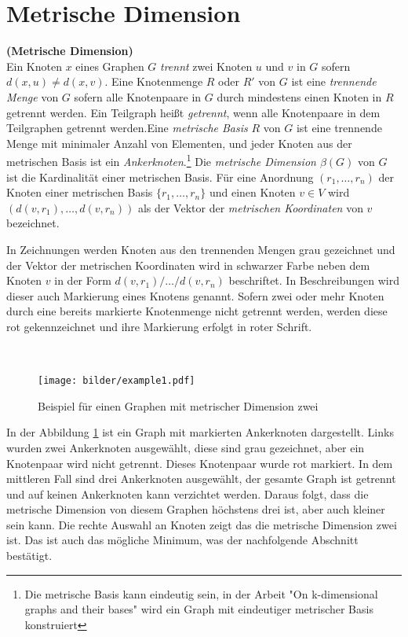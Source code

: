 \newpage
\section{Metrische Dimension}
\label{MDT}
\begin{defi}{\textbf{(Metrische Dimension)}}\\
Ein Knoten $x$ eines Graphen $G$ \emph{trennt} zwei Knoten $u$ und $v$ in $G$ sofern $d(x, u) \neq d(x, v)$. Eine Knotenmenge $R$ oder $R'$ von $G$ ist eine \emph{trennende Menge} von $G$ sofern alle Knotenpaare in $G$ durch mindestens einen Knoten in $R$ getrennt werden. Ein Teilgraph heißt \emph{getrennt}, wenn alle Knotenpaare in dem Teilgraphen getrennt werden.\newline \newline Eine \emph{metrische Basis} $R$ von $G$ ist eine trennende Menge mit minimaler Anzahl von Elementen, und jeder Knoten aus der metrischen Basis ist ein \emph{Ankerknoten}.\footnote{Die metrische Basis kann eindeutig sein, in der Arbeit "On k-dimensional graphs and their bases"\cite{bases} wird ein Graph mit eindeutiger metrischer Basis konstruiert} \newline\newline %
Die \emph{metrische Dimension $\beta(G)$} von $G$ ist die Kardinalität einer metrischen Basis. Für eine Anordnung $(r_1,\ldots,r_n)$ der Knoten einer metrischen Basis $\{r_1,\ldots,r_n\}$ und einen Knoten $v \in V$ wird $(d(v, r_1 ), \ldots , d(v, r_n ))$ als der Vektor der \emph{metrischen Koordinaten} von $v$ bezeichnet.
\end{defi}
\begin{bem}
In Zeichnungen werden Knoten aus den trennenden Mengen grau gezeichnet und der Vektor der metrischen Koordinaten wird in schwarzer Farbe neben dem Knoten $v$ in der Form $d(v, r_1 )/ \ldots / d(v, r_n )$ beschriftet. In Beschreibungen wird dieser auch Markierung eines Knotens genannt. Sofern zwei oder mehr Knoten durch eine bereits markierte Knotenmenge nicht getrennt werden, werden diese rot gekennzeichnet und ihre Markierung erfolgt in roter Schrift. 
\end{bem}
\begin{bsp}~
\begin{figure}[h!]
		\centering 		 
   \texttt{[image: bilder/example1.pdf]}
	\caption{Beispiel für einen Graphen mit metrischer Dimension zwei}
  	 \label{bild:bsp}
  	 \end{figure}
In der Abbildung \ref{bild:bsp} ist ein Graph mit markierten Ankerknoten dargestellt.
Links wurden zwei Ankerknoten ausgewählt, diese sind grau gezeichnet, aber ein Knotenpaar wird nicht getrennt. Dieses Knotenpaar wurde rot markiert. In dem mittleren Fall sind drei Ankerknoten ausgewählt, der gesamte Graph ist getrennt und auf keinen Ankerknoten kann verzichtet werden. Daraus folgt, dass die metrische Dimension von diesem Graphen höchstens drei ist, aber auch kleiner sein kann. Die rechte Auswahl an Knoten zeigt das die metrische Dimension zwei ist. Das ist auch das mögliche Minimum, was der nachfolgende Abschnitt bestätigt.
\end{bsp}
